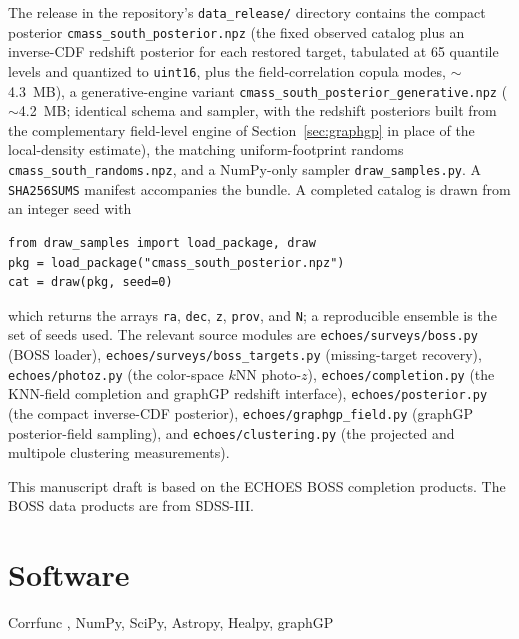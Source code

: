 \documentclass[apj]{emulateapj}
\providecommand{\software}[1]{\section*{Software}#1}
\begin{document}
The release in the repository's \texttt{data\_release/} directory contains the compact
posterior \texttt{cmass\_south\_posterior.npz} (the fixed observed catalog plus
an inverse-CDF redshift posterior for each restored target, tabulated at 65
quantile levels and quantized to \texttt{uint16}, plus the field-correlation copula modes,
$\sim$4.3~MB), a generative-engine variant
\texttt{cmass\_south\_posterior\_generative.npz} ($\sim$4.2~MB; identical schema and
sampler, with the redshift posteriors built from the complementary field-level
engine of Section~\ref{sec:graphgp} in place of the local-density estimate), the
matching uniform-footprint randoms \texttt{cmass\_south\_randoms.npz}, and a
NumPy-only sampler \texttt{draw\_samples.py}.  A \texttt{SHA256SUMS} manifest accompanies
the bundle.  A completed catalog is drawn from an integer
seed with
\begin{verbatim}
from draw_samples import load_package, draw
pkg = load_package("cmass_south_posterior.npz")
cat = draw(pkg, seed=0)
\end{verbatim}
which returns the arrays \texttt{ra}, \texttt{dec}, \texttt{z}, \texttt{prov},
and \texttt{N}; a reproducible ensemble is the set of seeds used.  The relevant
source modules are \texttt{echoes/surveys/boss.py} (BOSS loader),
\texttt{echoes/surveys/boss\_targets.py} (missing-target recovery),
\texttt{echoes/photoz.py} (the color-space $k$NN photo-$z$),
\texttt{echoes/completion.py} (the KNN-field completion and graphGP redshift
interface), \texttt{echoes/posterior.py} (the compact inverse-CDF posterior),
\texttt{echoes/graphgp\_field.py} (graphGP posterior-field sampling), and
\texttt{echoes/clustering.py} (the projected and multipole clustering
measurements).

\acknowledgments
This manuscript draft is based on the ECHOES BOSS completion products.  The BOSS
data products are from SDSS-III.

\software{Corrfunc \citep{Corrfunc2020}, NumPy, SciPy, Astropy, Healpy,
graphGP}



\end{document}
